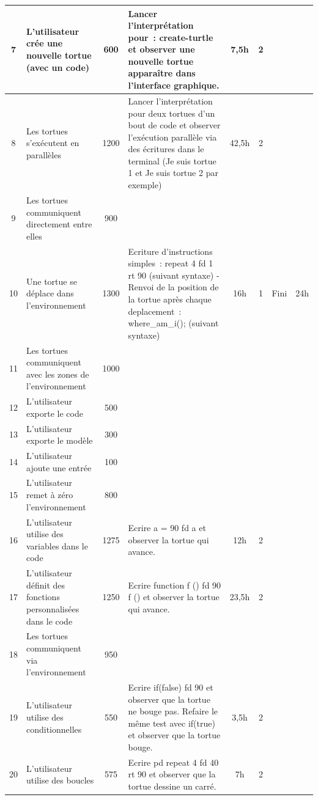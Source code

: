 {\begin{longtable}[c]{|c|p{2cm}|c|p{4cm}|*{4}{c|}}
\hline
7 & L'utilisateur crée une nouvelle tortue (avec un code) & 600 & Lancer l'interprétation pour~: create-turtle {} et observer une nouvelle tortue apparaître dans l'interface graphique. & 7,5h & 2 &  &  \\
\hline
8 & Les tortues s'exécutent en parallèles & 1200 & Lancer l'interprétation pour deux tortues d'un bout de code et observer l'exécution parallèle via des écritures dans le terminal (Je suis tortue 1 et Je
suis tortue 2 par exemple) & 42,5h & 2 & & \\
\hline
9 & Les tortues communiquent directement entre elles & 900 &  &  &  &  &  \\
\hline
10 & Une tortue se déplace dans l'environnement & 1300 & Ecriture d'instructions simples~: repeat 4 { fd 1 rt 90 } (suivant syntaxe) - Renvoi de la position de la tortue après chaque deplacement~: where\_am\_i(); (suivant syntaxe) & 16h & 1 & Fini & 24h \\
\hline
11 & Les tortues communiquent avec les zones de l'environnement & 1000 &  &  &  &  &  \\
\hline
12 & L'utilisateur exporte le code & 500 &  &  &  &  &  \\
\hline
13 & L'utilisateur exporte le modèle & 300 &  &  &  &  &  \\
\hline
14 & L'utilisateur ajoute une entrée & 100 &  &  &  &  &  \\
\hline
15 & L'utilisateur remet à zéro l'environnement & 800 &  &  &  &  &  \\
\hline
16 & L'utilisateur utilise des variables dans le code & 1275 & Ecrire a = 90 fd a et observer la tortue qui avance. & 12h & 2 &  &  \\
\hline
17 & L'utilisateur définit des fonctions personnalisées dans le code & 1250 & Ecrire function f () { fd 90 } f () et observer la tortue qui avance. & 23,5h & 2 & &  \\
\hline
18 & Les tortues communiquent via l'environnement & 950 &  &  &  &  &  \\
\hline
19 & L'utilisateur utilise des conditionnelles & 550 & Ecrire if(false) { fd 90 } et observer que la tortue ne bouge pas. Refaire le même test avec if(true) et observer que la tortue bouge. & 3,5h & 2 &  &  \\
\hline
20 & L'utilisateur utilise des boucles & 575 & Ecrire pd repeat 4 { fd 40 rt 90 } et observer que la tortue dessine un carré. & 7h & 2 &  &  \\
\hline
\end{longtable}}

